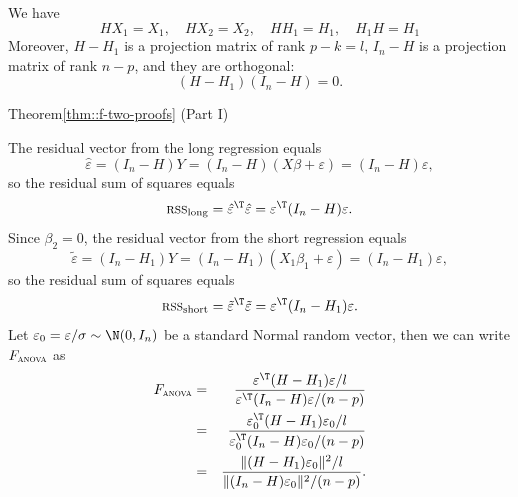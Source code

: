 \begin{lemma}\label{lemma::projection-m-F}
We have
$$
HX_{1}=X_{1}, \quad HX_2 = X_2, \quad  HH_{1} =H_{1},\quad H_{1}H=H_{1}
$$
Moreover, 
$H-H_{1}$ is a projection matrix of rank $p-k=l$, 
$I_{n}-H$ is a projection matrix of rank $n-p$, and they are orthogonal:
\begin{equation}
(H-H_{1})(I_{n}-H)=0.\label{eq:basic4}
\end{equation}
\end{lemma}

\begin{myproof}{Theorem}{\ref{thm::f-two-proofs} (Part I)}

The residual vector from the long regression equals 
$$
\hat{\varepsilon}=(I_{n}-H)Y=(I_{n}-H)(X\beta+\varepsilon)=(I_{n}-H)\varepsilon ,
$$
so the residual sum of squares equals 
\[
\textsc{rss}_{\text{long}}=\hat{\varepsilon}^{\T}\hat{\varepsilon}=\varepsilon^{\T}(I_{n}-H)\varepsilon . 
\]
Since $\beta_{2}=0$, the residual vector from the short regression
equals
$$
\tilde{\varepsilon}=(I_{n}-H_{1})Y=(I_{n}-H_{1})(X_{1}\beta_{1}+\varepsilon)=(I_{n}-H_{1})\varepsilon , 
$$
so the residual sum of squares equals
\[
\textsc{rss}_{\text{short}}=\tilde{\varepsilon}^{\T}\tilde{\varepsilon}=\varepsilon^{\T}(I_{n}-H_{1})\varepsilon.
\]
Let $\varepsilon_{0}=\varepsilon/\sigma\sim\N(0,I_{n})$ be a standard
Normal random vector, then we can write $F_\textsc{anova} $ as
\begin{eqnarray}
F_\textsc{anova}  &=& \frac{\varepsilon^{\T}(H-H_{1})\varepsilon/l}{\varepsilon^{\T}(I_{n}-H)\varepsilon/(n-p)} \nonumber  \\
&=&\frac{\varepsilon_{0}^{\T}(H-H_{1})\varepsilon_{0}/l}{\varepsilon_{0}^{\T}(I_{n}-H)\varepsilon_{0}/(n-p)} \nonumber\\
&=&\frac{\|(H-H_{1})\varepsilon_{0}\|^{2}/l}{\|(I_{n}-H)\varepsilon_{0}\|^{2}/(n-p)}.\label{eq:FratioofQ}
\end{eqnarray}


\end{myproof}
